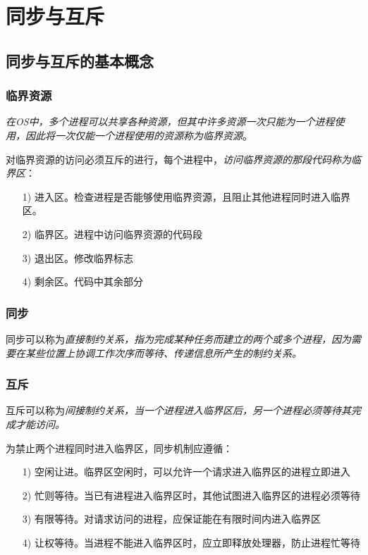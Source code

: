 \section{同步与互斥}

\subsection{同步与互斥的基本概念}

\subsubsection{临界资源}

    \emph{在OS中，多个进程可以共享各种资源，但其中许多资源一次只能为一个进程使用，因此\color{red}将一次仅能一个进程使用的资源称为临界资源}。

    对临界资源的访问必须互斥的进行，每个进程中，\emph{访问临界资源的那段代码称为临界区}：

\begin{itemize}
    \item [1)] 进入区。检查进程是否能够使用临界资源，且阻止其他进程同时进入临界区。
    \item [2)] 临界区。进程中访问临界资源的代码段
    \item [3)] 退出区。修改临界标志
    \item [4)] 剩余区。代码中其余部分
\end{itemize}

\subsubsection{同步}

    同步可以称为\emph{直接制约关系，指为完成某种任务而建立的两个或多个进程，因为需要在某些位置上协调工作次序而等待、传递信息所产生的制约关系。}

\subsubsection{互斥}

    互斥可以称为\emph{间接制约关系，当一个进程进入临界区后，另一个进程必须等待其完成才能访问。}

    为禁止两个进程同时进入临界区，同步机制应遵循：

\begin{itemize}
    \item [1)] 空闲让进。临界区空闲时，可以允许一个请求进入临界区的进程立即进入
    \item [2)] 忙则等待。当已有进程进入临界区时，其他试图进入临界区的进程必须等待
    \item [3)] 有限等待。对请求访问的进程，应保证能在有限时间内进入临界区
    \item [4)] 让权等待。当进程不能进入临界区时，应立即释放处理器，防止进程忙等待
\end{itemize}

